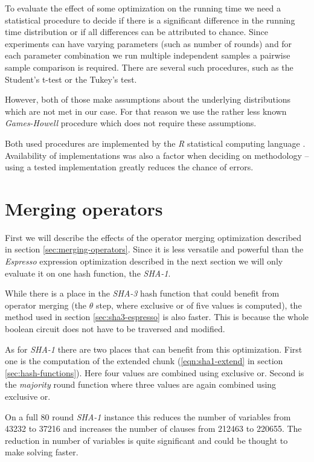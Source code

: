 To evaluate the effect of some optimization on the running time we need a statistical procedure to decide if there is a significant difference in the running time distribution or if all differences can be attributed to chance.
Since experiments can have varying parameters (such as number of rounds) and for each parameter combination we run multiple independent samples a pairwise sample comparison is required.
There are several such procedures, such as the Student's t-test or the Tukey's test.

However, both of those make assumptions about the underlying distributions which are not met in our case.
For that reason we use the rather less known \emph{Games-Howell} procedure \cite{games1976pairwise} which does not require these assumptions.

Both used procedures are implemented by the \emph{R} statistical computing language \cite{rteam2013}.
Availability of implementations was also a factor when deciding on methodology -- using a tested implementation greatly reduces the chance of errors.

\section{Merging operators}
First we will describe the effects of the operator merging optimization described in section \ref{sec:merging-operators}.
Since it is less versatile and powerful than the \emph{Espresso} expression optimization described in the next section we will only evaluate it on one hash function, the \emph{SHA-1}.

While there is a place in the \emph{SHA-3} hash function that could benefit from operator merging (the $\theta$ step, where exclusive or of five values is computed), the method used in section \ref{sec:sha3-espresso} is also faster.
This is because the whole boolean circuit does not have to be traversed and modified.

As for \emph{SHA-1} there are two places that can benefit from this optimization.
First one is the computation of the extended chunk (\ref{eqn:sha1-extend} in section \ref{sec:hash-functions}).
Here four values are combined using exclusive or.
Second is the \emph{majority} round function where three values are again combined using exclusive or.

On a full $80$ round \emph{SHA-1} instance this reduces the number of variables from \num{43232} to \num{37216} and increases the number of clauses from \num{212463} to \num{220655}.
The reduction in number of variables is quite significant and could be thought to make solving faster.

